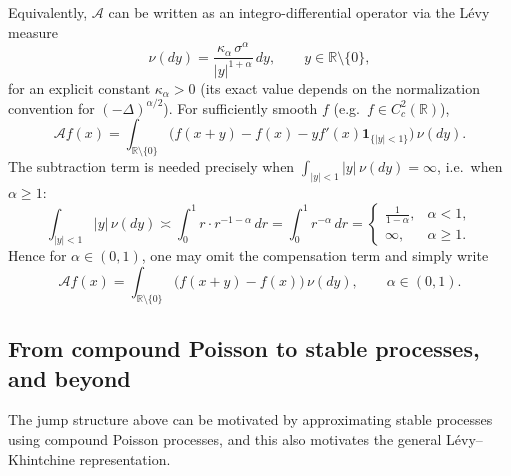 \documentclass[11pt]{article}
\begin{document}
Equivalently, $\mathcal{A}$ can be written as an integro-differential operator via the L\'evy measure
\begin{equation}\label{eq:stable_levy_measure}
\nu(dy) = \frac{\kappa_\alpha\,\sigma^\alpha}{|y|^{1+\alpha}}\,dy,
\qquad y\in\mathbb R\setminus\{0\},
\end{equation}
for an explicit constant $\kappa_\alpha>0$ (its exact value depends on the normalization convention for $(-\Delta)^{\alpha/2}$). For sufficiently smooth $f$ (e.g.\ $f\in C_c^2(\mathbb R)$),
\begin{equation}\label{eq:generator_levy_form}
\mathcal{A}f(x)
=
\int_{\mathbb R\setminus\{0\}}
\Big(
f(x+y)-f(x)-y f'(x)\mathbf 1_{\{|y|<1\}}
\Big)\,\nu(dy).
\end{equation}
The subtraction term is needed precisely when $\int_{|y|<1}|y|\,\nu(dy)=\infty$, i.e.\ when $\alpha\ge 1$:
\begin{equation}\label{eq:compensation_condition}
\int_{|y|<1}|y|\,\nu(dy)
\asymp \int_0^1 r\cdot r^{-1-\alpha}\,dr
=
\int_0^1 r^{-\alpha}\,dr
=
\begin{cases}
\frac{1}{1-\alpha}, & \alpha<1,\\
\infty, & \alpha\ge 1.
\end{cases}
\end{equation}
Hence for $\alpha\in(0,1)$, one may omit the compensation term and simply write
\begin{equation}\label{eq:generator_alpha_lt_1}
\mathcal{A}f(x)
=
\int_{\mathbb R\setminus\{0\}}
\big(f(x+y)-f(x)\big)\,\nu(dy),
\qquad \alpha\in(0,1).
\end{equation}

\subsection{From compound Poisson to stable processes, and beyond}\label{subsec:compound_poisson_to_levy}

The jump structure above can be motivated by approximating stable processes using compound Poisson processes, and this also motivates the general L\'evy--Khintchine representation.
\end{document}
